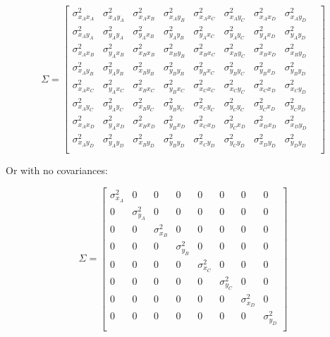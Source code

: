 \[
\Sigma = 
\begin{bmatrix}
\sigma_{x_Ax_A}^2 & \sigma_{x_Ay_A}^2 & \sigma_{x_Ax_B}^2 & \sigma_{x_Ay_B}^2 & \sigma_{x_Ax_C}^2 & \sigma_{x_Ay_C}^2 & \sigma_{x_Ax_D}^2 & \sigma_{x_Ay_D}^2 &  \\ 
\sigma_{x_Ay_A}^2 & \sigma_{y_Ay_A}^2 & \sigma_{y_Ax_B}^2 & \sigma_{y_Ay_B}^2 & \sigma_{y_Ax_C}^2 & \sigma_{y_Ay_C}^2 & \sigma_{y_Ax_D}^2 & \sigma_{y_Ay_D}^2 &  \\ 
\sigma_{x_Ax_B}^2 & \sigma_{y_Ax_B}^2 & \sigma_{x_Bx_B}^2 & \sigma_{x_By_B}^2 & \sigma_{x_Bx_C}^2 & \sigma_{x_By_C}^2 & \sigma_{x_Bx_D}^2 & \sigma_{x_By_D}^2 &  \\ 
\sigma_{x_Ay_B}^2 & \sigma_{y_Ay_B}^2 & \sigma_{x_By_B}^2 & \sigma_{y_By_B}^2 & \sigma_{y_Bx_C}^2 & \sigma_{y_By_C}^2 & \sigma_{y_Bx_D}^2 & \sigma_{y_By_D}^2 &  \\ 
\sigma_{x_Ax_C}^2 & \sigma_{y_Ax_C}^2 & \sigma_{x_Bx_C}^2 & \sigma_{y_Bx_C}^2 & \sigma_{x_Cx_C}^2 & \sigma_{x_Cy_C}^2 & \sigma_{x_Cx_D}^2 & \sigma_{x_Cy_D}^2 &  \\ 
\sigma_{x_Ay_C}^2 & \sigma_{y_Ay_C}^2 & \sigma_{x_By_C}^2 & \sigma_{y_By_C}^2 & \sigma_{x_Cy_C}^2 & \sigma_{y_Cy_C}^2 & \sigma_{y_Cx_D}^2 & \sigma_{y_Cy_D}^2 &  \\ 
\sigma_{x_Ax_D}^2 & \sigma_{y_Ax_D}^2 & \sigma_{x_Bx_D}^2 & \sigma_{y_Bx_D}^2 & \sigma_{x_Cx_D}^2 & \sigma_{y_Cx_D}^2 & \sigma_{x_Dx_D}^2 & \sigma_{x_Dy_D}^2 &  \\ 
\sigma_{x_Ay_D}^2 & \sigma_{y_Ay_D}^2 & \sigma_{x_By_D}^2 & \sigma_{y_By_D}^2 & \sigma_{x_Cy_D}^2 & \sigma_{y_Cy_D}^2 & \sigma_{x_Dy_D}^2 & \sigma_{y_Dy_D}^2 &  \\ 
\end{bmatrix}
\]

Or with no covariances:

\[
\Sigma = 
\begin{bmatrix}
\sigma_{x_A}^2 &  0 &  0 &  0 &  0 &  0 &  0 &  0  \\ 
0 & \sigma_{y_A}^2 &  0 &  0 &  0 &  0 &  0 &  0   \\ 
0 &  0 & \sigma_{x_B}^2 &  0 &  0 &  0 &  0 &  0   \\ 
0 &  0 &  0 & \sigma_{y_B}^2 &  0 &  0 &  0 &  0   \\ 
0 &  0 &  0 &  0 & \sigma_{x_C}^2 &  0 &  0 &  0   \\ 
0 &  0 &  0 &  0 &  0 & \sigma_{y_C}^2 &  0 &  0   \\ 
0 &  0 &  0 &  0 &  0 &  0 & \sigma_{x_D}^2 &  0   \\ 
0 &  0 &  0 &  0 &  0 &  0 &  0 & \sigma_{y_D}^2   \\ 
\end{bmatrix}
\]

